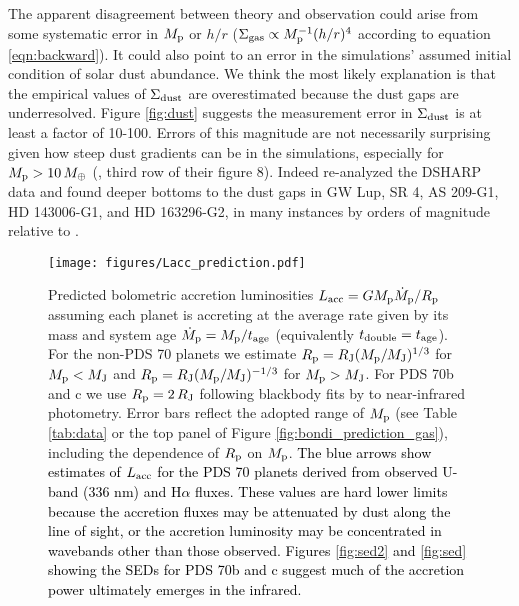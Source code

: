 \documentclass[fleqn,usenatbib]{mnras}
\newcommand{\nick}[1]{\textcolor{black}{ #1}}
\newcommand{\Sigg}{\Sigma_{\rm gas}}
\newcommand{\Sigd}{\Sigma_{\rm dust}}
\begin{document}
The apparent disagreement between theory and observation could 
arise from some systematic error in $M_{\rm p}$ or $h/r$ ($\Sigg \propto M_{\rm p}^{-1}(h/r)^4$ according to equation \ref{eqn:backward}). It could also point to an error in the simulations' assumed initial condition of solar dust abundance. 
We think the most likely explanation is that the empirical values of $\Sigd$ are overestimated because the dust gaps are underresolved. Figure \ref{fig:dust} suggests the measurement error in $\Sigd$ is at least a factor of 10-100. Errors of this magnitude are not necessarily surprising given how steep dust gradients can be in the simulations, especially for $M_{\rm p} > 10 \,M_\oplus$
(\citealt{dong_etal_2017}, third row of their figure 8). Indeed \citet[][their figure 12]{jennings_etal_2021} re-analyzed the DSHARP data and found deeper bottoms to the dust gaps in GW Lup, SR 4, AS 209-G1, HD 143006-G1, and HD 163296-G2, in many instances by orders of magnitude relative to \citet{huang_etal_2018}.


\begin{figure*} 
\texttt{[image: figures/Lacc\_prediction.pdf]}
\vspace{-2mm}
\caption{Predicted bolometric accretion luminosities $L_{\rm acc} = GM_{\rm p}\dot{M}_{\rm p}/R_{\rm p}$ assuming each planet is accreting at the average rate given by its mass and system age $\dot{M}_{\rm p} = M_{\rm p}/t_{\rm age}$ (equivalently $t_{\rm double} = t_{\rm age}$). For the non-PDS 70 planets we estimate $R_{\rm p} = R_{\rm J} (M_{\rm p}/M_{\rm J})^{1/3}$ for $M_{\rm p} < M_{\rm J}$ and $R_{\rm p} = R_{\rm J} (M_{\rm p}/M_{\rm J})^{-1/3}$ for $M_{\rm p} > M_{\rm J}$. For PDS 70b and c we use $R_{\rm p} = 2\,R_{\rm J}$ following blackbody fits by \protect \citet{wang_etal_2020} to near-infrared photometry. Error bars reflect the adopted range of $M_{\rm p}$ (see Table \ref{tab:data} or the top panel of Figure \ref{fig:bondi_prediction_gas}), including the dependence of $R_{\rm p}$ on $M_{\rm p}$. \nick{The blue arrows show estimates of $L_{\rm acc}$ for the PDS 70 planets derived from observed U-band (336 nm) and H$\alpha$ fluxes. These values are hard lower limits because the accretion fluxes may be attenuated by dust along the line of sight, or the accretion luminosity may be concentrated in wavebands other than those observed. Figures \ref{fig:sed2} and \ref{fig:sed} showing the SEDs for PDS 70b and c suggest much of the accretion power ultimately emerges in the infrared.}
}
  \label{fig:Lacc_prediction}
\end{figure*}
\end{document}
